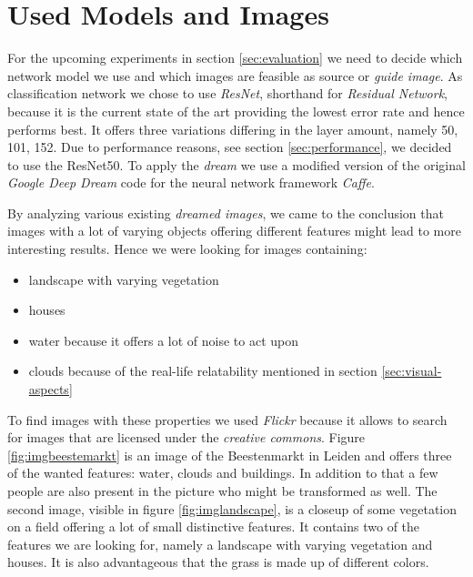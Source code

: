 \section{Used Models and Images}
\label{sec:data}
For the upcoming experiments in section \ref{sec:evaluation} we need to decide which network model we use and which images are feasible as source or \emph{guide image}.
As classification network we chose to use \emph{ResNet}\cite{he2016deep}, shorthand for \emph{Residual Network}, because it is the current state of the art providing the lowest error rate and hence performs best.\cite{cnnComparison}
It offers three variations differing in the layer amount, namely 50, 101, 152.
Due to performance reasons, see section \ref{sec:performance}, we decided to use the ResNet50.
To apply the \emph{dream} we use a modified version of the original \textit{Google Deep Dream} code\cite{deep-dream-github} for the neural network framework \textit{Caffe}\cite{jia2014caffe}.

By analyzing various existing \emph{dreamed images}, we came to the conclusion that images with a lot of varying objects offering different features might lead to more interesting results.
Hence we were looking for images containing: 
\begin{itemize}
	\item landscape with varying vegetation
	\item houses
	\item water because it offers a lot of noise to act upon
	\item clouds because of the real-life relatability mentioned in section \ref{sec:visual-aspects}
\end{itemize}

To find images with these properties we used \emph{Flickr} because it allows to search for images that are licensed under the \emph{creative commons}.
Figure \ref{fig:imgbeestemarkt} is an image of the Beestenmarkt in Leiden and offers three of the wanted features: water, clouds and buildings.
In addition to that a few people are also present in the picture who might be transformed as well.
The second image, visible in figure \ref{fig:imglandscape}, is a closeup of some vegetation on a field offering a lot of small distinctive features.
It contains two of the features we are looking for, namely a landscape with varying vegetation and houses.
It is also advantageous that the grass is made up of different colors.



